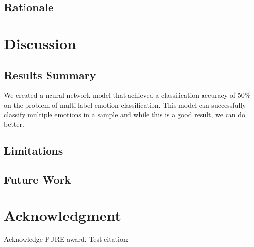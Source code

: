 \documentclass[conference]{IEEEtran}
\begin{document}
\subsection{Rationale}



\section{Discussion}

\subsection{Results Summary}

We created a neural network model that achieved a classification accuracy of 50\% on the problem of multi-label emotion classification. This model can successfully classify multiple emotions in a sample and while this is a good result, we can do better.

\subsection{Limitations}

\subsection{Future Work}

\section*{Acknowledgment}
Acknowledge PURE award. Test citation: \cite{N.Fahlgren}




\end{document}
